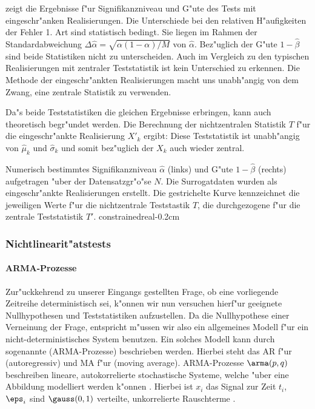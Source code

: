  zeigt die Ergebnisse f"ur Signifikanzniveau und G"ute des Tests
mit eingeschr"anken Realisierungen. Die Unterschiede bei den relativen H"aufigkeiten der
Fehler 1. Art sind statistisch bedingt. Sie liegen im Rahmen der Standardabweichung
$\Delta\hat\alpha=\sqrt{\alpha(1-\alpha)/M}$ von $\hat\alpha$. Bez"uglich der G"ute
$1-\hat\beta$ sind beide Statistiken nicht zu unterscheiden. Auch im Vergleich zu den
typischen Realisierungen mit zentraler Teststatistik ist kein Unterschied zu erkennen.
Die Methode der eingeschr"ankten Realisierungen macht uns unabh"angig von dem Zwang,
eine zentrale Statistik zu verwenden.

Da"s beide Teststatistiken die gleichen Ergebnisse erbringen, kann auch theoretisch
begr"undet werden.  Die Berechnung der nichtzentralen Statistik $T$ f"ur die
eingeschr"ankte Realisierung $X'_k$ ergibt:
Diese Teststatistik ist unabh"angig von $\hat\mu_k$ und $\hat\sigma_k$ und somit
bez"uglich der $X_k$ auch wieder zentral. 

{Numerisch
   bestimmtes Signifikanzniveau $\hat\alpha$ (links) und G"ute $1-\hat\beta$ (rechts)
   aufgetragen "uber der Datensatzgr"o"se $N$. Die Surrogatdaten wurden als eingeschr"ankte
   Realisierungen erstellt. Die gestrichelte Kurve kennzeichnet die jeweiligen Werte f"ur
   die nichtzentrale Teststastik $T$, die durchgezogene f"ur die zentrale Teststatistik $T'$. 
}
{constrainedreal}{-0.2cm}


\subsubsection{Nichtlinearit"atstests}

\paragraph{ARMA-Prozesse}
Zur"uckkehrend zu unserer Eingangs gestellten Frage, ob eine vorliegende Zeitreihe deterministisch 
sei, k"onnen wir nun versuchen hierf"ur geeignete Nullhypothesen und Teststatistiken
aufzustellen. Da die Nullhypothese einer Verneinung der Frage, entspricht m"ussen wir also 
ein allgemeines Modell f"ur ein nicht-deterministisches System benutzen. Ein solches
Modell kann durch sogenannte \begriff(ARMA-Prozesse) beschrieben werden. Hierbei steht
das AR f"ur \begriff(autoregressiv) und MA f"ur \begriff(moving average). ARMA-Prozesse $\arma(p,q)$
beschreiben lineare, autokorrelierte stochastische Systeme, welche "uber eine Abbildung 
modelliert werden k"onnen \cite{Theiler92b}. Hierbei ist $x_i$ das Signal zur Zeit $t_i$, $\eps_i$ sind
$\gauss(0,1)$ verteilte, unkorrelierte Rauschterme .

